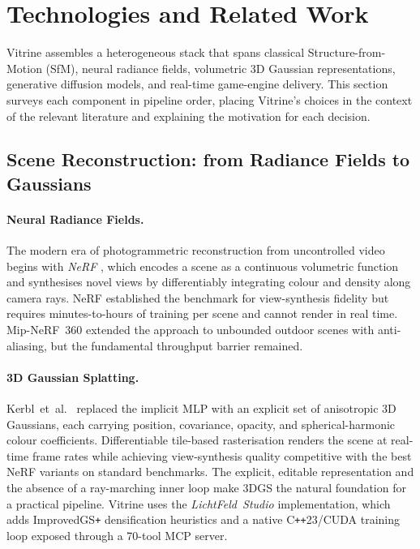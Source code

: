%

\section{Technologies and Related Work}
\label{sec:tech}

Vitrine assembles a heterogeneous stack that spans classical Structure-from-Motion
(SfM), neural radiance fields, volumetric 3D Gaussian representations, generative
diffusion models, and real-time game-engine delivery.  This section surveys each
component in pipeline order, placing Vitrine's choices in the context of the
relevant literature and explaining the motivation for each decision.

\subsection{Scene Reconstruction: from Radiance Fields to Gaussians}
\label{sec:tech:recon}

\paragraph{Neural Radiance Fields.}
The modern era of photogrammetric reconstruction from uncontrolled video begins with
\emph{NeRF} \cite{mildenhall2020_nerf}, which encodes a scene as a continuous
volumetric function and synthesises novel views by differentiably integrating colour
and density along camera rays.  NeRF established the benchmark for view-synthesis
fidelity but requires minutes-to-hours of training per scene and cannot render in
real time.  Mip-NeRF~360 \cite{barron2022_mipnerf360} extended the approach to
unbounded outdoor scenes with anti-aliasing, but the fundamental throughput barrier
remained.

\paragraph{3D Gaussian Splatting.}
Kerbl~et~al.\ \cite{kerbl2023_3dgs} replaced the implicit MLP with an explicit set
of anisotropic 3D Gaussians, each carrying position, covariance, opacity, and
spherical-harmonic colour coefficients.  Differentiable tile-based rasterisation
renders the scene at real-time frame rates while achieving view-synthesis quality
competitive with the best NeRF variants on standard benchmarks.  The explicit,
editable representation and the absence of a ray-marching inner loop make 3DGS the
natural foundation for a practical pipeline.  Vitrine uses the
\emph{LichtFeld~Studio} \cite{lichtfeld2026} implementation, which adds
ImprovedGS\texttt{+} densification heuristics and a native C\texttt{++}23/CUDA
training loop exposed through a 70-tool MCP server.

